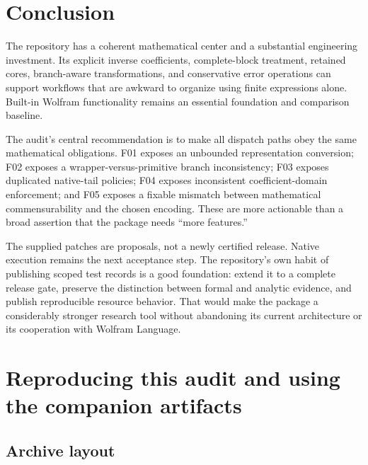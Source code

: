 \section{Conclusion}

The repository has a coherent mathematical center and a substantial engineering investment. Its explicit inverse coefficients, complete-block treatment, retained cores, branch-aware transformations, and conservative error operations can support workflows that are awkward to organize using finite expressions alone. Built-in Wolfram functionality remains an essential foundation and comparison baseline.\cite{core,guide,operations,gammainverse,native}

The audit's central recommendation is to make all dispatch paths obey the same mathematical obligations. F01 exposes an unbounded representation conversion; F02 exposes a wrapper-versus-primitive branch inconsistency; F03 exposes duplicated native-tail policies; F04 exposes inconsistent coefficient-domain enforcement; and F05 exposes a fixable mismatch between mathematical commensurability and the chosen encoding. These are more actionable than a broad assertion that the package needs ``more features.''

The supplied patches are proposals, not a newly certified release. Native execution remains the next acceptance step. The repository's own habit of publishing scoped test records is a good foundation: extend it to a complete release gate, preserve the distinction between formal and analytic evidence, and publish reproducible resource behavior. That would make the package a considerably stronger research tool without abandoning its current architecture or its cooperation with Wolfram Language.

\appendix
\section{Reproducing this audit and using the companion artifacts}
\label{sec:reproduce}

\subsection{Archive layout}

